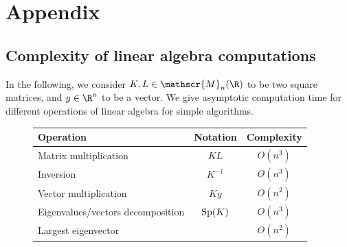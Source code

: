 \documentclass{../cs-classes/cs-classes}
\begin{document}
\section{Appendix}
\subsection{Complexity of linear algebra computations}
In the following, we consider $K, L\in\mathscr{M}_n(\R)$ to be two square matrices, and $y\in\R^n$ to be a vector. We give asymptotic computation time for different operations of linear algebra for simple algorithms.

\begin{figure}[H]
    \centering
    \begin{tabular}{|l|c|c|}
        \hline
        \bf Operation & \bf Notation & \bf Complexity\\
        \hline\hline
        Matrix multiplication & $KL$ & $O(n^3)$\\\hline
        Inversion & $K^{-1}$ & $O(n^3)$\\\hline
        Vector multiplication & $Ky$ & $O(n^2)$\\\hline
        Eigenvalues/vectors decomposition & $\textnormal{Sp}(K)$ & $O(n^3)$\\\hline
        Largest eigenvector & & $O(n^2)$\\\hline
    \end{tabular}
\end{figure}
\end{document}
